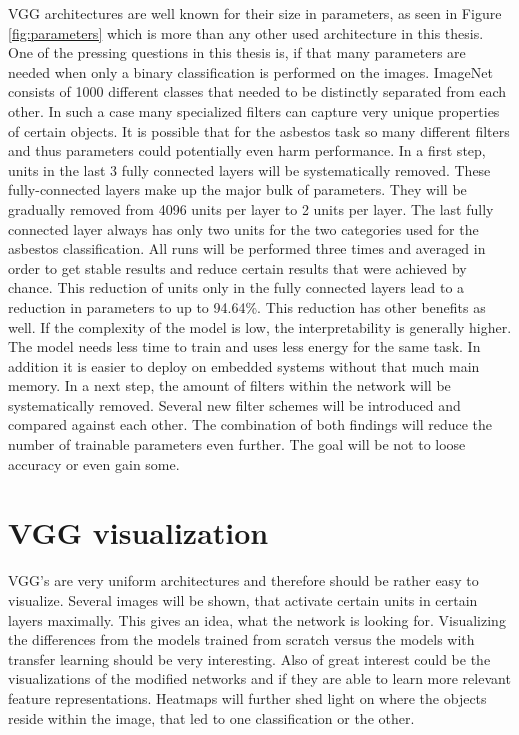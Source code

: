 VGG architectures are well known for their size in parameters, as seen in Figure \ref{fig:parameters} which is more than any other used architecture in this thesis. One of the pressing questions in this thesis is, if that many parameters are needed when only a binary classification is performed on the images. ImageNet consists of 1000 different classes that needed to be distinctly separated from each other. In such a case many specialized filters can capture very unique properties of certain objects. It is possible that for the asbestos task so many different filters and thus parameters could  potentially even harm performance. In a first step, units in the last 3 fully connected layers will be systematically removed. These fully-connected layers make up the major bulk of parameters. They will be gradually removed from 4096 units per layer to 2 units per layer. The last fully connected layer always has only two units for the two categories used for the asbestos classification. All runs will be performed  three times  and averaged in order to get stable results and reduce certain results that were achieved by chance.  This reduction of units only in the fully connected layers lead to a reduction in parameters to up to 94.64\%. This reduction has other benefits as well. If the complexity of the model is low, the interpretability is generally higher. The model needs less time to train and uses less energy for the same task.  In addition it is easier to deploy on embedded systems without that much main memory. In a next step, the amount of filters within the network will be systematically removed. Several new filter schemes will be introduced and compared against each other. The combination of both findings will reduce the number of trainable parameters even further. The goal will be not to loose accuracy or even gain some.\\

\section{VGG visualization}

VGG's are very uniform architectures and therefore should be rather easy to visualize. Several images will be shown, that activate certain units in certain layers maximally. This gives an idea, what the network is looking for. Visualizing the differences from the models trained from scratch versus the models with transfer learning should be very interesting. Also of great interest could be the visualizations of the modified networks and if they are able to learn more relevant feature representations. Heatmaps will further shed light on where the objects reside within the  image, that led to one classification or the other. \\


